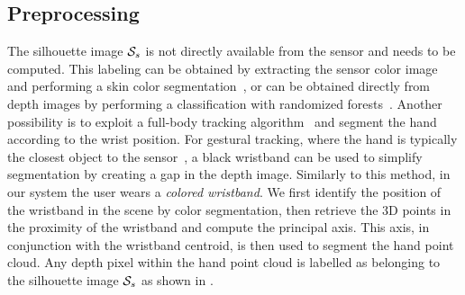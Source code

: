 \label{sec:tech}
\subsection*{Preprocessing}
The  silhouette image $\mathcal{S}_{s}$ is not directly available from the sensor and needs to be computed. This labeling can be obtained by extracting  the sensor color image and performing a skin color segmentation~\cite{oiko_cvpr12,schroder2014real}, or can be obtained directly from depth images by performing a classification with randomized forests~\cite{tompson2014real}. Another possibility is to exploit a full-body tracking algorithm~\cite{shotton_cvpr11} and segment the hand according to the wrist position. For gestural tracking, where the hand is typically the closest object to the sensor~\cite{qian2014realtime}, a black wristband can be used to simplify segmentation by creating a gap in the depth image. Similarly to this method, in our system the user wears a \emph{colored wristband}. We first identify the position of the wristband in the scene by color segmentation,
then retrieve the 3D points in the proximity of the wristband and compute the principal axis. This axis, in conjunction with the wristband centroid, is then used to segment the hand point cloud. Any depth pixel within the hand point cloud is labelled as belonging to the silhouette image $\mathcal{S}_{s}$ as shown in .



